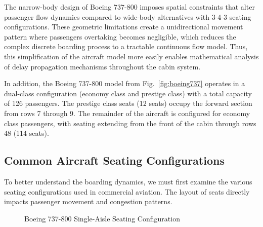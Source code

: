 \documentclass[12pt,a4paper]{article}
\begin{document}
The narrow-body design of Boeing 737-800 imposes spatial constraints that alter passenger flow dynamics compared to wide-body alternatives with 3-4-3 seating configurations. These geometric limitations create a unidirectional movement pattern where passengers overtaking becomes negligible, which reduces the complex discrete boarding process to a tractable continuous flow model. Thus, this simplification of the aircraft model more easily enables mathematical analysis of delay propagation mechanisms throughout the cabin system.

In addition, the Boeing 737-800 model from Fig.~\ref{fig:boeing737} operates in a dual-class configuration (economy class and prestige class) with a total capacity of 126 passengers. The prestige class seats (12 seats) occupy the forward section from rows 7 through 9. The remainder of the aircraft is configured for economy class passengers, with seating extending from the front of the cabin through rows 48 (114 seats).

\subsection{Common Aircraft Seating Configurations}

To better understand the boarding dynamics, we must first examine the various seating configurations used in commercial aviation. The layout of seats directly impacts passenger movement and congestion patterns.

\begin{figure}[H]
\centering
{}
\caption{Boeing 737-800 Single-Aisle Seating Configuration}
\label{fig:boeing737_seating}
\end{figure}
\end{document}
